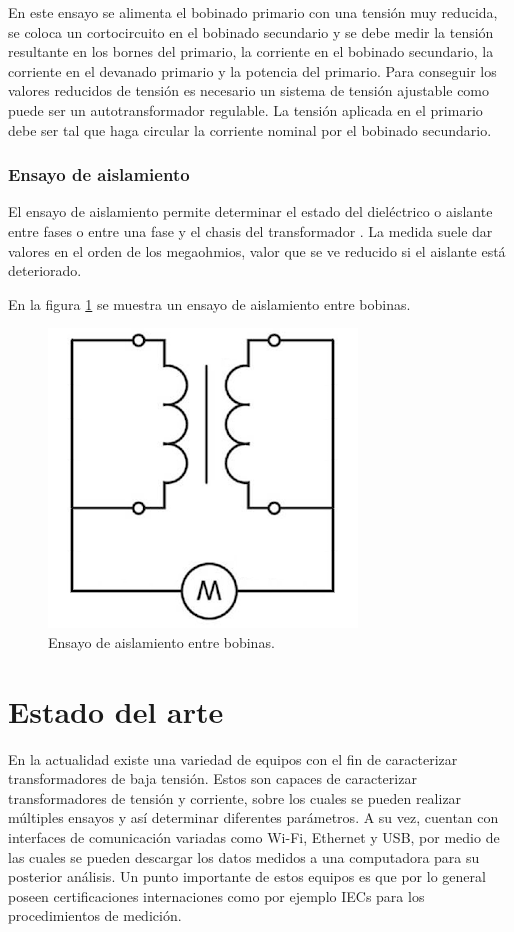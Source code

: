 En este ensayo se alimenta el bobinado primario con una tensión muy reducida, se coloca un cortocircuito en el bobinado secundario y se debe medir la tensión resultante en los bornes del primario, la corriente en el bobinado secundario, la corriente en el devanado primario y la potencia del primario. Para conseguir los valores reducidos de tensión es necesario un sistema de tensión ajustable como puede ser un autotransformador regulable. La tensión aplicada en el primario debe ser tal que haga circular la corriente nominal por el bobinado secundario.

\subsubsection{Ensayo de aislamiento}

El ensayo de aislamiento permite determinar el estado del dieléctrico o aislante entre fases o entre una fase y el chasis del transformador \citep{TRAFO_AISL}. La medida suele dar valores en el orden de los megaohmios, valor que se ve reducido si el aislante está deteriorado.

En la figura \ref{fig:figEnsayoAislacion} se muestra un ensayo de aislamiento entre bobinas.

\begin{figure}[htpb]
	\centering
	\includegraphics[scale=.5]{./Figures/EnsayoAislacion.png}
	\caption{Ensayo de aislamiento entre bobinas.}
	\label{fig:figEnsayoAislacion}
\end{figure}



\section{Estado del arte}
En la actualidad existe una variedad de equipos con el fin de caracterizar transformadores de baja tensión. Estos son capaces de caracterizar transformadores de tensión y corriente, sobre los cuales se pueden realizar múltiples ensayos y así determinar diferentes parámetros. A su vez, cuentan con interfaces de comunicación variadas como Wi-Fi, Ethernet y USB, por medio de las cuales se pueden descargar los datos medidos a una computadora para su posterior análisis. Un punto importante de estos equipos es que por lo general poseen certificaciones internaciones como por ejemplo IECs para los procedimientos de medición.

